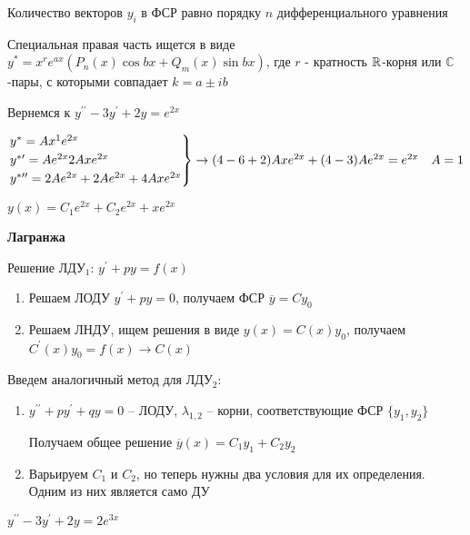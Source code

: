 \documentclass[12pt]{article}
\begin{document}
    \Nota Количество векторов $y_i$ в ФСР равно порядку $n$ дифференциального уравнения

    Специальная правая часть ищется в виде $y^* = x^r e^{ax} (P_n(x)\cos bx + Q_m (x)\sin bx)$, где $r$ - кратность $\mathbb{R}$-корня или $\mathbb{C}$-пары, с которыми совпадает $k = a \pm ib$

    \Ex Вернемся к $y^{\prime\prime} - 3y^\prime + 2y = e^{2x}$

    $\begin{rcases*}
    y^* = Ax^1 e^{2x} \\
    y^{*\prime} = Ae^{2x} 2Axe^{2x} \\
    y^{*\prime\prime} = 2Ae^{2x} + 2Ae^{2x} + 4Axe^{2x}
    \end{rcases*} \to (4 - 6 + 2) Axe^{2x} + (4 - 3) Ae^{2x} = e^{2x} \quad A = 1$

    $y(x) = C_1 e^{2x} + C_2 e^{2x} + xe^{2x}$

    \mediumvspace

    \hypertarget{methodLagrangesecondorder}{}

    \item \textbf{Лагранжа}

    \Mems Решение ЛДУ$_1$: $y^\prime + py = f(x)$

    \begin{enumerate}[label*=\arabic*) ]
        \item Решаем ЛОДУ $y^\prime + py = 0$, получаем ФСР $\overline{y} = Cy_0$

        \item Решаем ЛНДУ, ищем решения в виде $y(x) = C(x)y_0$, получаем $C^\prime(x) y_0 = f(x) \to C(x)$
    \end{enumerate}

    \Nota Введем аналогичный метод для ЛДУ$_2$:

    \begin{enumerate}[label*=\arabic* этап) ]
        \item $y^{\prime\prime} + py^\prime + qy = 0$ -- ЛОДУ, $\lambda_{1, 2}$ -- корни, соответствующие ФСР $\{y_1, y_2\}$

        Получаем общее решение $\overline{y}(x) = C_1 y_1 + C_2 y_2$

        \item Варьируем $C_1$ и $C_2$, но теперь нужны два условия для их определения. Одним из них является само ДУ
    \end{enumerate}

    \Ex $y^{\prime\prime} - 3y^\prime + 2y = 2e^{3x}$
\end{document}

